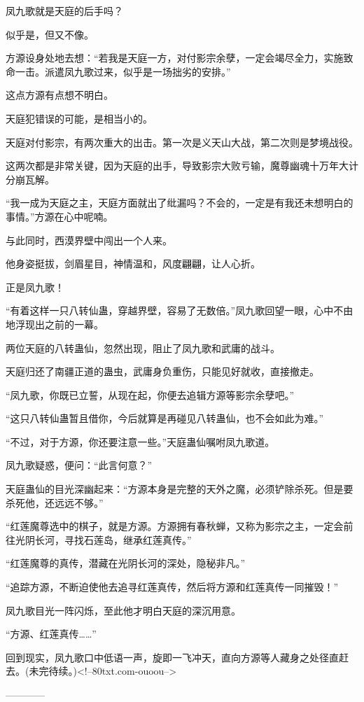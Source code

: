 \begin{this_body}
凤九歌就是天庭的后手吗？

似乎是，但又不像。

方源设身处地去想：“若我是天庭一方，对付影宗余孽，一定会竭尽全力，实施致命一击。派遣凤九歌过来，似乎是一场拙劣的安排。”

这点方源有点想不明白。

天庭犯错误的可能，是相当小的。

天庭对付影宗，有两次重大的出击。第一次是义天山大战，第二次则是梦境战役。

这两次都是非常关键，因为天庭的出手，导致影宗大败亏输，魔尊幽魂十万年大计分崩瓦解。

“我一成为天庭之主，天庭方面就出了纰漏吗？不会的，一定是有我还未想明白的事情。”方源在心中呢喃。

与此同时，西漠界壁中闯出一个人来。

他身姿挺拔，剑眉星目，神情温和，风度翩翩，让人心折。

正是凤九歌！

“有着这样一只八转仙蛊，穿越界壁，容易了无数倍。”凤九歌回望一眼，心中不由地浮现出之前的一幕。

两位天庭的八转蛊仙，忽然出现，阻止了凤九歌和武庸的战斗。

天庭归还了南疆正道的蛊虫，武庸身负重伤，只能见好就收，直接撤走。

“凤九歌，你既已立誓，从现在起，你便去追辑方源等影宗余孽吧。”

“这只八转仙蛊暂且借你，今后就算是再碰见八转蛊仙，也不会如此为难。”

“不过，对于方源，你还要注意一些。”天庭蛊仙嘱咐凤九歌道。

凤九歌疑惑，便问：“此言何意？”

天庭蛊仙的目光深幽起来：“方源本身是完整的天外之魔，必须铲除杀死。但是要杀死他，还远远不够。”

“红莲魔尊选中的棋子，就是方源。方源拥有春秋蝉，又称为影宗之主，一定会前往光阴长河，寻找石莲岛，继承红莲真传。”

“红莲魔尊的真传，潜藏在光阴长河的深处，隐秘非凡。”

“追踪方源，不断迫使他去追寻红莲真传，然后将方源和红莲真传一同摧毁！”

凤九歌目光一阵闪烁，至此他才明白天庭的深沉用意。

“方源、红莲真传……”

回到现实，凤九歌口中低语一声，旋即一飞冲天，直向方源等人藏身之处径直赶去。(未完待续。)<!--80txt.com-ouoou-->

------------

\end{this_body}

